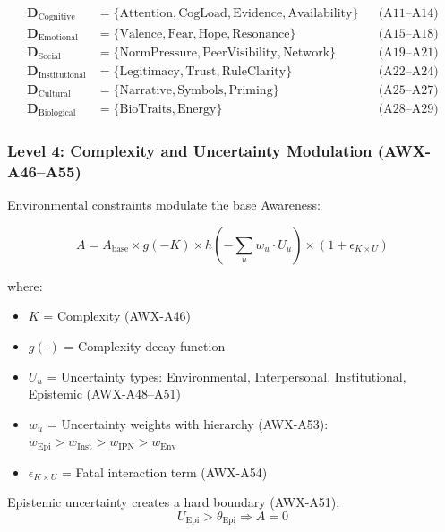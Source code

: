 \begin{align}
\mathbf{D}_{\text{Cognitive}} &= \{\text{Attention}, \text{CogLoad}, \text{Evidence}, \text{Availability}\} && \text{(A11--A14)} \\
\mathbf{D}_{\text{Emotional}} &= \{\text{Valence}, \text{Fear}, \text{Hope}, \text{Resonance}\} && \text{(A15--A18)} \\
\mathbf{D}_{\text{Social}} &= \{\text{NormPressure}, \text{PeerVisibility}, \text{Network}\} && \text{(A19--A21)} \\
\mathbf{D}_{\text{Institutional}} &= \{\text{Legitimacy}, \text{Trust}, \text{RuleClarity}\} && \text{(A22--A24)} \\
\mathbf{D}_{\text{Cultural}} &= \{\text{Narrative}, \text{Symbols}, \text{Priming}\} && \text{(A25--A27)} \\
\mathbf{D}_{\text{Biological}} &= \{\text{BioTraits}, \text{Energy}\} && \text{(A28--A29)}
\end{align}

\subsubsection{Level 4: Complexity and Uncertainty Modulation (AWX-A46--A55)}

Environmental constraints modulate the base Awareness:

\begin{equation}
A = A_{\text{base}} \times g(-K) \times h\left(-\sum_{u} w_u \cdot U_u\right) \times (1 + \epsilon_{K \times U})
\label{eq:complexity-uncertainty}
\end{equation}

where:
\begin{itemize}
    \item $K$ = Complexity (AWX-A46)
    \item $g(\cdot)$ = Complexity decay function
    \item $U_u$ = Uncertainty types: Environmental, Interpersonal, Institutional, Epistemic (AWX-A48--A51)
    \item $w_u$ = Uncertainty weights with hierarchy (AWX-A53): $w_{\text{Epi}} > w_{\text{Inst}} > w_{\text{IPN}} > w_{\text{Env}}$
    \item $\epsilon_{K \times U}$ = Fatal interaction term (AWX-A54)
\end{itemize}

Epistemic uncertainty creates a hard boundary (AWX-A51):
\begin{equation}
U_{\text{Epi}} > \theta_{\text{Epi}} \Rightarrow A = 0
\end{equation}

